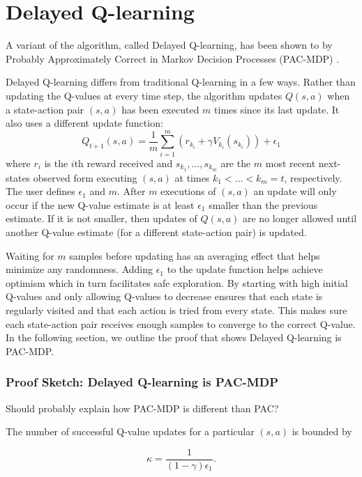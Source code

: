 \documentclass{article} %
\begin{document}
\section{Delayed Q-learning}
A variant of the algorithm, called Delayed Q-learning, has been shown to by Probably Approximately Correct in Markov Decision Processes (PAC-MDP) \cite{strehl_pac_2006}.


Delayed Q-learning differs from traditional Q-learning in a few ways.  Rather than updating the Q-values at every time step, the algorithm updates $Q(s,a)$ when a state-action pair $(s,a)$ has been executed $m$ times since its last update.  It also uses a different update function:
$$Q_{t+1}(s,a) = \frac{1}{m}\sum_{i=1}^m(r_{k_i}+\gamma V_{k_i}(s_{k_i})) + \epsilon_1$$  
where $r_i$ is the $i$th reward received and $s_{k_1},\dots,s_{k_m}$ are the $m$ most recent next-states observed form executing $(s,a)$ at times $k_1 < \dots < k_m = t$, respectively. The user defines $\epsilon_1$ and $m$.   
After $m$ executions of $(s,a)$ an update will only occur if the new Q-value estimate is at least $\epsilon_1$ smaller than the previous estimate.  If it is not smaller, then updates of $Q(s,a)$ are no longer allowed until another Q-value estimate (for a different state-action pair) is updated.

Waiting for $m$ samples before updating has an averaging effect that helps minimize any randomness. Adding $\epsilon_1$ to the update function helps achieve optimism which in turn facilitates safe exploration. By starting with high initial Q-values and only allowing Q-values to decrease ensures that each state is regularly visited and that each action is tried from every state.  This makes sure each state-action pair receives enough samples to converge to the correct Q-value.%
In the following section, we outline the proof that shows Delayed Q-learning is PAC-MDP.


\subsubsection{Proof Sketch: Delayed Q-learning is PAC-MDP}

Should probably explain how PAC-MDP is different than PAC?


The number of successful Q-value updates for a particular $(s,a)$ is bounded by

$$\kappa = \frac{1}{(1-\gamma)\epsilon_1}.$$
\end{document}
